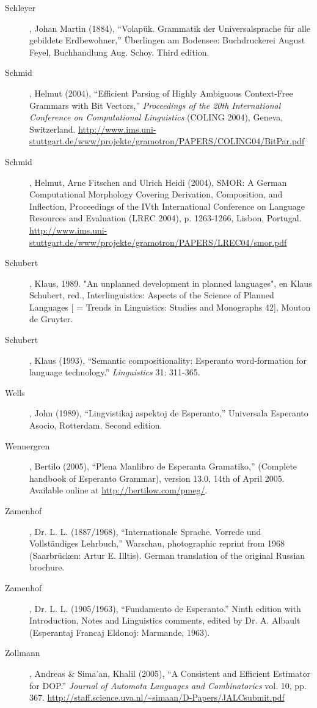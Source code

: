 \documentclass[10pt,a4paper]{article}
\begin{document}
\begin{description}
\item[Schleyer], Johan Martin (1884), ``Volapük. Grammatik der Universalsprache für
alle gebildete Erdbewohner,'' Überlingen am Bodensee: Buchdruckerei August
Feyel, Buchhandlung Aug. Schoy. Third edition.

\item[Schmid], Helmut (2004), ``Efficient Parsing of Highly Ambiguous Context-Free
Grammars with Bit Vectors,'' {\em Proceedings of the 20th International Conference
on Computational Linguistics} (COLING 2004), Geneva, Switzerland.
\url{http://www.ims.uni-stuttgart.de/www/projekte/gramotron/PAPERS/COLING04/BitPar.pdf}

\item[Schmid], Helmut, Arne Fitschen and Ulrich Heidi (2004), SMOR: A German Computational Morphology Covering Derivation, Composition, and Inflection, Proceedings of the IVth International Conference on Language Resources and Evaluation (LREC 2004), p. 1263-1266, Lisbon, Portugal. \url{http://www.ims.uni-stuttgart.de/www/projekte/gramotron/PAPERS/LREC04/smor.pdf}

\item[Schubert], Klaus, 1989. "An unplanned development in planned languages", en Klaus Schubert, red., Interlinguistics: Aspects of the Science of Planned Languages [ = Trends in Linguistics: Studies and Monographs 42], Mouton de Gruyter.

\item[Schubert], Klaus (1993), ``Semantic compositionality: Esperanto word-formation
for language technology.'' {\em Linguistics} 31: 311-365.

\item[Wells], John (1989), ``Lingvistikaj aspektoj de Esperanto,'' Universala
Esperanto Asocio, Rotterdam. Second edition.

\item[Wennergren], Bertilo (2005), ``Plena Manlibro de Esperanta Gramatiko,''
(Complete handbook of Esperanto Grammar), version 13.0, 14th of April 2005.
Available online at \url{http://bertilow.com/pmeg/}.

\item[Zamenhof], Dr. L. L. (1887/1968), ``Internationale Sprache. Vorrede und
Vollständiges Lehrbuch,'' Warschau, photographic reprint from 1968
(Saarbrücken: Artur E. Illtis). German translation of the original Russian
brochure.

\item[Zamenhof], Dr. L. L. (1905/1963), ``Fundamento de Esperanto.'' Ninth edition
with Introduction, Notes and Linguistics comments, edited by Dr. A. Albault
(Esperantaj Francaj Eldonoj: Marmande, 1963).

\item[Zollmann], Andreas \& Sima'an, Khalil (2005), ``A Consistent and Efficient
Estimator for DOP.''  {\em Journal of Automota Languages and Combinatorics} vol.
10, pp. 367.  \url{http://staff.science.uva.nl/~simaan/D-Papers/JALCsubmit.pdf}

\end{description}
\end{document}
